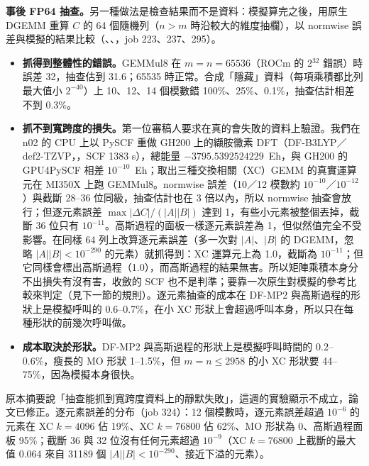 \textbf{事後 FP64 抽查。}另一種做法是檢查結果而不是資料：模擬算完之後，用原生 DGEMM 重算 $C$ 的 64 個隨機列（$n>m$ 時沿較大的維度抽欄），以 normwise 誤差與模擬的結果比較（、、，job 223、237、295）。
\begin{itemize}
  \item \textbf{抓得到整體性的錯誤。}GEMMul8 在 $m=n=65536$（ROCm 的 2$^{32}$ 錯誤）時誤差 32，抽查估到 31.6；65535 時正常。合成「隱藏」資料（每項乘積都比列最大值小 $2^{-40}$）上 10、12、14 個模數錯 100\%、25\%、0.1\%，抽查估計相差不到 0.3\%。
  \item \textbf{抓不到寬跨度的損失。}第一位審稿人要求在真的會失敗的資料上驗證。我們在 n02 的 CPU 上以 PySCF 重做 GH200 上的纈胺黴素 DFT（DF-B3LYP／def2-TZVP，，SCF 1383 s），總能量 $-3795.5392524229$~Eh，與 GH200 的 GPU4PySCF 相差 $10^{-10}$~Eh；取出三種交換相關（XC）GEMM 的真實運算元在 MI350X 上跑 GEMMul8。normwise 誤差（10／12 模數約 $10^{-10}$／$10^{-12}$）與截斷 28–36 位同級，抽查估計也在 3 倍以內，所以 normwise 抽查會放行；但逐元素誤差 $\max|\Delta C|/(|A||B|)$ 達到 1，有些小元素被整個丟掉，截斷 36 位只有 $10^{-11}$。高斯過程的面板一樣逐元素誤差為 1，但似然值完全不受影響。在同樣 64 列上改算逐元素誤差（多一次對 $|A|$、$|B|$ 的 DGEMM，忽略 $|A||B|<10^{-290}$ 的元素）就抓得到：XC 運算元上為 1.0，截斷為 $10^{-11}$；但它同樣會標出高斯過程（1.0），而高斯過程的結果無害。所以矩陣乘積本身分不出損失有沒有害，收斂的 SCF 也不是判準；要靠一次原生對模擬的參考比較來判定（見下一節的規則）。逐元素抽查的成本在 DF-MP2 與高斯過程的形狀上是模擬呼叫的 0.6–0.7\%，在小 XC 形狀上會超過呼叫本身，所以只在每種形狀的前幾次呼叫做。
  \item \textbf{成本取決於形狀。}DF-MP2 與高斯過程的形狀上是模擬呼叫時間的 0.2–0.6\%，瘦長的 MO 形狀 1–1.5\%，但 $m=n\le2958$ 的小 XC 形狀要 44–75\%，因為模擬本身很快。
\end{itemize}
原本摘要說「抽查能抓到寬跨度資料上的靜默失敗」，這週的實驗顯示不成立，論文已修正。逐元素誤差的分布（job 324）：12 個模數時，逐元素誤差超過 $10^{-6}$ 的元素在 XC $k=4096$ 佔 19\%、XC $k=76800$ 佔 62\%、MO 形狀為 0、高斯過程面板 95\%；截斷 36 與 32 位沒有任何元素超過 $10^{-9}$（XC $k=76800$ 上截斷的最大值 0.064 來自 31189 個 $|A||B|<10^{-290}$、接近下溢的元素）。

